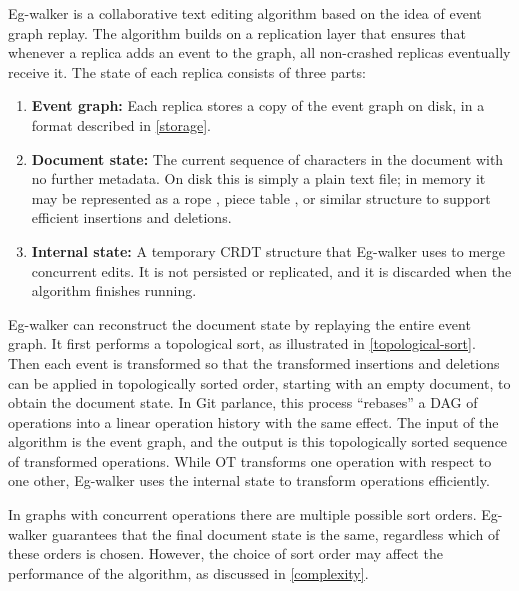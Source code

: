 \documentclass[sigplan,10pt]{acmart}
\newcommand{\algname}{Eg-walker\xspace}
\begin{document}
\algname is a collaborative text editing algorithm based on the idea of event graph replay.
The algorithm builds on a replication layer that ensures that whenever a replica adds an event to the graph, all non-crashed replicas eventually receive it.
The state of each replica consists of three parts:

\begin{enumerate}
\item \textbf{Event graph:} Each replica stores a copy of the event graph on disk, in a format described in \autoref{storage}.
\item \textbf{Document state:} The current sequence of characters in the document with no further metadata. On disk this is simply a plain text file; in memory it may be represented as a rope \cite{Boehm1995}, piece table \cite{vscode-buffer}, or similar structure to support efficient insertions and deletions.
\item \textbf{Internal state:} A temporary CRDT structure that \algname uses to merge concurrent edits. It is not persisted or replicated, and it is discarded when the algorithm finishes running.
\end{enumerate}

\algname can reconstruct the document state by replaying the entire event graph.
It first performs a topological sort, as illustrated in \autoref{topological-sort}. Then each event is transformed so that the transformed insertions and deletions can be applied in topologically sorted order, starting with an empty document, to obtain the document state.
In Git parlance, this process ``rebases'' a DAG of operations into a linear operation history with the same effect.
The input of the algorithm is the event graph, and the output is this topologically sorted sequence of transformed operations.
While OT transforms one operation with respect to one other, \algname uses the internal state to transform operations efficiently.

In graphs with concurrent operations there are multiple possible sort orders. \algname guarantees that the final document state is the same, regardless which of these orders is chosen. However, the choice of sort order may affect the performance of the algorithm, as discussed in \autoref{complexity}.
\end{document}
